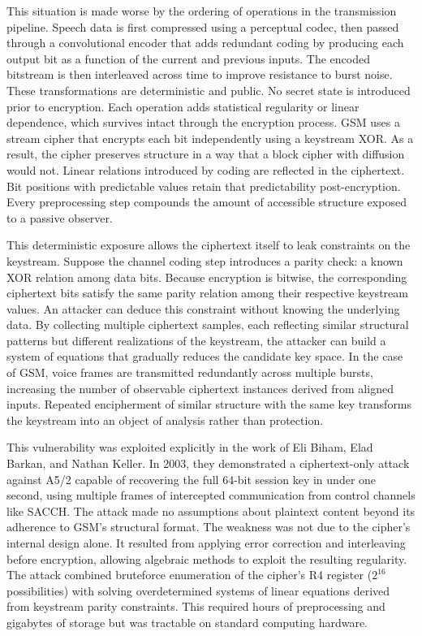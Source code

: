 This situation is made worse by the ordering of operations in the transmission pipeline. Speech data is first compressed using a perceptual codec, then passed through a convolutional encoder that adds redundant coding by producing each output bit as a function of the current and previous inputs. The encoded bitstream is then interleaved across time to improve resistance to burst noise. These transformations are deterministic and public. No secret state is introduced prior to encryption. Each operation adds statistical regularity or linear dependence, which survives intact through the encryption process. GSM uses a stream cipher that encrypts each bit independently using a keystream XOR. As a result, the cipher preserves structure in a way that a block cipher with diffusion would not. Linear relations introduced by coding are reflected in the ciphertext. Bit positions with predictable values retain that predictability post-encryption. Every preprocessing step compounds the amount of accessible structure exposed to a passive observer.

This deterministic exposure allows the ciphertext itself to leak constraints on the keystream. Suppose the channel coding step introduces a parity check: a known XOR relation among data bits. Because encryption is bitwise, the corresponding ciphertext bits satisfy the same parity relation among their respective keystream values. An attacker can deduce this constraint without knowing the underlying data. By collecting multiple ciphertext samples, each reflecting similar structural patterns but different realizations of the keystream, the attacker can build a system of equations that gradually reduces the candidate key space. In the case of GSM, voice frames are transmitted redundantly across multiple bursts, increasing the number of observable ciphertext instances derived from aligned inputs. Repeated encipherment of similar structure with the same key transforms the keystream into an object of analysis rather than protection.

This vulnerability was exploited explicitly in the work of Eli Biham, Elad Barkan, and Nathan Keller. In 2003, they demonstrated a ciphertext-only attack against A5/2 capable of recovering the full 64-bit session key in under one second, using multiple frames of intercepted communication from control channels like SACCH. The attack made no assumptions about plaintext content beyond its adherence to GSM’s structural format. The weakness was not due to the cipher’s internal design alone. It resulted from applying error correction and interleaving before encryption, allowing algebraic methods to exploit the resulting regularity. The attack combined bruteforce enumeration of the cipher's R4 register ($2^{16}$ possibilities) with solving overdetermined systems of linear equations derived from keystream parity constraints. This required hours of preprocessing and gigabytes of storage but was tractable on standard computing hardware.

